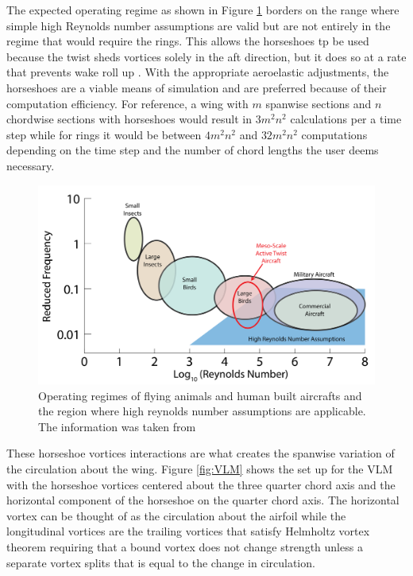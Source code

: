 \documentclass[11pt]{ucthesis}
\begin{document}
The expected operating regime as shown in Figure \ref{fig:reynolds} borders on the range where simple high Reynolds number assumptions are valid but are not entirely in the regime that would require the rings. This allows the horseshoes tp be used because the twist sheds vortices solely in the aft direction, but it does so at a rate that prevents wake roll up \cite{koochesfahani1989vortical}. With the appropriate aeroelastic adjustments, the horseshoes are a viable means of simulation and are preferred because of their computation efficiency. For reference, a wing with $m$ spanwise sections and $n$ chordwise sections with horseshoes would result in $3m^2n^2$ calculations per a time step while for rings it would be between $4m^2n^2$ and $32m^2n^2$ computations depending on the time step and the number of chord lengths the user deems necessary. 

\begin{figure}[thpb]
\centering
\includegraphics[width=1\linewidth]{Figures/ReducedFrequencyvReynoldsTypes-01.png}
\caption{Operating regimes of flying animals and human built aircrafts and the region where high reynolds number assumptions are applicable. The information was taken from \cite{mueller2001fixed}}
\label{fig:reynolds}
\end{figure}

These horseshoe vortices interactions are what creates the spanwise variation of the circulation about the wing. Figure \ref{fig:VLM} shows the set up for the VLM with the horseshoe vortices centered about the three quarter chord axis and the horizontal component of the horseshoe on the quarter chord axis. The horizontal vortex can be thought of as the circulation about the airfoil while the longitudinal vortices are the trailing vortices that satisfy Helmholtz vortex theorem requiring that a bound vortex does not change strength unless a separate vortex splits that is equal to the change in circulation. 
\end{document}
